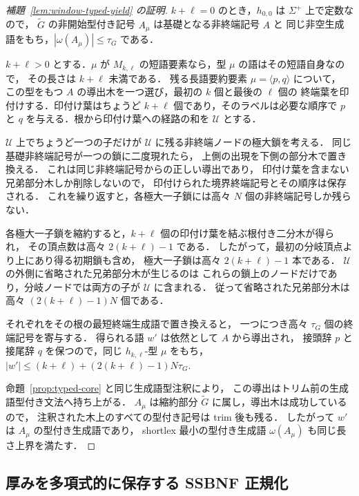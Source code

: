 \documentclass[11pt,a4paper]{ltjsarticle}
\theoremstyle{remark}
\theoremstyle{plain}
\begin{document}
\begin{proof}[補題~\ref{lem:window-typed-yield} の証明]
$k+\ell=0$ のとき，$h_{0,0}$ は $\Sigma^+$ 上で定数なので，
$\widetilde G$ の非開始型付き記号 $A_\mu$ は基礎となる非終端記号 $A$ と
同じ非空生成語をもち，$|\omega(A_\mu)|\le\tau_G$ である．

$k+\ell>0$ とする．$\mu$ が $M_{k,\ell}$ の短語要素なら，型 $\mu$ の語はその短語自身なので，
その長さは $k+\ell$ 未満である．
残る長語要約要素 $\mu=\langle p,q\rangle$ について，
この型をもつ $A$ の導出木を一つ選び，最初の $k$ 個と最後の $\ell$ 個の
終端葉を印付けする．印付け葉はちょうど $k+\ell$ 個であり，そのラベルは必要な順序で
$p$ と $q$ を与える．根から印付け葉への経路の和を $\mathcal U$ とする．

$\mathcal U$ 上でちょうど一つの子だけが $\mathcal U$ に残る非終端ノードの極大鎖を考える．
同じ基礎非終端記号が一つの鎖に二度現れたら，
上側の出現を下側の部分木で置き換える．
これは同じ非終端記号からの正しい導出であり，
印付け葉を含まない兄弟部分木しか削除しないので，
印付けられた境界終端記号とその順序は保存される．
これを繰り返すと，各極大一子鎖には高々 $N$ 個の非終端記号しか残らない．

各極大一子鎖を縮約すると，$k+\ell$ 個の印付け葉を結ぶ根付き二分木が得られ，
その頂点数は高々 $2(k+\ell)-1$ である．
したがって，最初の分岐頂点より上にあり得る初期鎖も含め，
極大一子鎖は高々 $2(k+\ell)-1$ 本である．
$\mathcal U$ の外側に省略された兄弟部分木が生じるのは
これらの鎖上のノードだけであり，分岐ノードでは両方の子が $\mathcal U$ に含まれる．
従って省略された兄弟部分木は高々 $(2(k+\ell)-1)N$ 個である．

それぞれをその根の最短終端生成語で置き換えると，
一つにつき高々 $\tau_G$ 個の終端記号を寄与する．
得られる語 $w'$ は依然として $A$ から導出され，
接頭辞 $p$ と接尾辞 $q$ を保つので，同じ $h_{k,\ell}$-型 $\mu$ をもち，
$|w'|\le (k+\ell)+(2(k+\ell)-1)N\tau_G$.

命題~\ref{prop:typed-core} と同じ生成語型注釈により，
この導出はトリム前の生成語型付き文法へ持ち上がる．
$A_\mu$ は縮約部分 $\widetilde G$ に属し，導出木は成功しているので，
注釈された木上のすべての型付き記号は trim 後も残る．
したがって $w'$ は $A_\mu$ の型付き生成語であり，
shortlex 最小の型付き生成語 $\omega(A_\mu)$ も同じ長さ上界を満たす．
\end{proof}

\subsection{厚みを多項式的に保存する SSBNF 正規化}
\label{app:thick-ssbnf}
\end{document}
